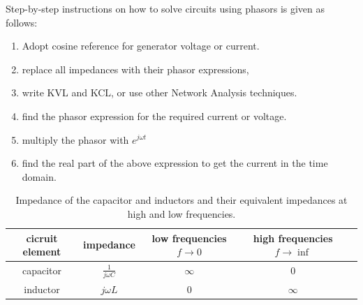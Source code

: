 \documentclass{ximera}
\begin{document}
 Step-by-step instructions on how to solve circuits using phasors is given as follows:
\begin{enumerate}
\item Adopt cosine reference for generator voltage or current. 
\item replace all impedances with their phasor expressions,
\item write KVL and KCL, or use other Network Analysis techniques.
\item find the phasor expression for the required current or voltage. 
\item multiply the phasor with $e^{j \omega t}$  
\item find the real part of the above expression to get the current in the time domain.
\end{enumerate}






\begin{table}
\centering
\begin{tabular}{|c|c|c|c|c|} \hline
cicruit element & impedance & low frequencies $f \to 0$& high frequencies $f \to \inf$   \\  \hline  
 capacitor     & $\frac{1}{j \omega C}$    & $\infty$ & $0$    \\  \hline       
 inductor & $j \omega L$              &    $0$   &       $\infty $             \\ \hline
\end{tabular}
\caption{Impedance of the capacitor and inductors and their equivalent impedances at high and low frequencies.}
\end{table}
\end{document}
